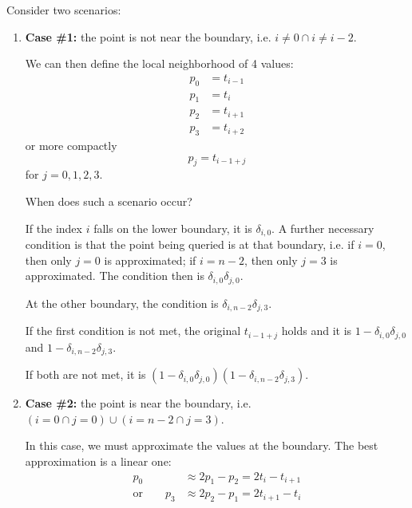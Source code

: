 \documentclass[11pt]{article}
\begin{document}
Consider two scenarios:
\begin{enumerate}
\item \textbf{Case \#1:} the point is not near the boundary, i.e. $i \neq 0 \cap i \neq i-2$.

We can then define the local neighborhood of 4 values:
\begin{equation*}
\begin{split}
p_0 &= t_{i-1} \\ 
p_1 &= t_i \\
p_2 &= t_{i+1} \\
p_3 &= t_{i+2}
\end{split}
\end{equation*}
or more compactly
\begin{equation*}
p_j = t_{i-1+j}
\end{equation*}
for $j=0,1,2,3$.

When does such a scenario occur?

If the index $i$ falls on the lower boundary, it is $\delta_{i,0}$. A further necessary condition is that the point being queried is at that boundary, i.e. if $i=0$, then only $j=0$ is approximated; if $i=n-2$, then only $j=3$ is approximated. The condition then is $\delta_{i,0} \delta_{j,0}$.

At the other boundary, the condition is $\delta_{i,n-2} \delta_{j,3}$.

If the first condition is not met, the original $t_{i-1+j}$ holds and it is $1-\delta_{i,0} \delta_{j,0}$ and $1-\delta_{i,n-2} \delta_{j,3}$.

If both are not met, it is $(1-\delta_{i,0} \delta_{j,0}) (1-\delta_{i,n-2} \delta_{j,3})$.

\item \textbf{Case \#2:} the point is near the boundary, i.e. $( i = 0 \cap j = 0) \cup ( i = n-2 \cap j = 3 )$.

In this case, we must approximate the values at the boundary. The best approximation is a linear one:
\begin{equation}
\begin{split}
p_0 &\approx 2 p_1 - p_2 = 2 t_i - t_{i+1} \\
\text{or} \qquad p_3 &\approx 2 p_2 - p_1 = 2 t_{i+1} - t_i
\end{split}
\end{equation}

\end{enumerate}
\end{document}
